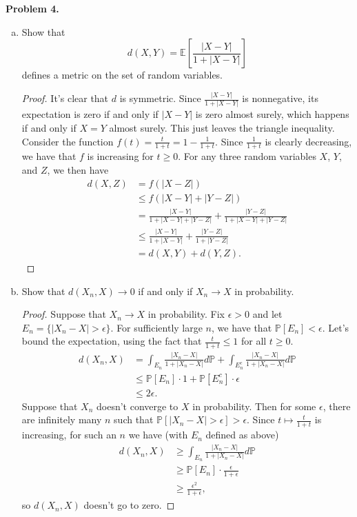 \documentclass[11pt,letterpaper]{report}
\newcommand{\E}{\mathbb{E}}
\newcommand{\Prob}{\mathbb{P}}
\begin{document}
\noindent\textbf{Problem 4. }
\begin{enumerate}[(a)]
	\item Show that
	\[
	d(X, Y) = \E\left[\frac{|X-Y|}{1+|X-Y|}\right]
	\]
	defines a metric on the set of random variables.
	\begin{proof}
		It's clear that $d$ is symmetric. Since $\frac{|X-Y|}{1+|X-Y|}$ is nonnegative, its expectation is zero if and only if $|X-Y|$ is zero almost surely, which happens if and only if $X = Y$ almost surely. This just leaves the triangle inequality.\\

		\noindent Consider the function $f(t) = \frac{t}{1+t}= 1 - \frac{1}{1+t}$.  Since $\frac{1}{1+t}$ is clearly decreasing, we have that $f$ is increasing for $t\geq 0$. For any three random variables $X$, $Y$, and $Z$, we then have
		\begin{align*}
			d(X, Z) &= f(|X-Z|)\\
			&\leq f(|X-Y| + |Y-Z|)\\
			&= \frac{|X-Y|}{1+|X-Y| + |Y-Z|} + \frac{|Y-Z|}{1+|X-Y| + |Y-Z|}\\
			&\leq \frac{|X-Y|}{1+|X-Y|} + \frac{|Y-Z|}{1+|Y-Z|}\\
			&= d(X, Y) + d(Y, Z).
		\end{align*}
	\end{proof}

	\item Show that $d(X_n, X)\to 0$ if and only if $X_n\to X$ in probability.
	\begin{proof}
		Suppose that $X_n\to X$ in probability. Fix $\epsilon > 0$ and let $E_n = \{|X_n - X|>\epsilon\}$. For sufficiently large $n$, we have that $\Prob[E_n] < \epsilon$. Let's bound the expectation, using the fact that $\frac{t}{1+t}\leq 1$ for all $t\geq 0$.
		\begin{align*}
			d(X_n, X) &= \int_{E_n}\frac{|X_n-X|}{1+|X_n-X|}d\Prob + \int_{E_n^c}\frac{|X_n-X|}{1+|X_n-X|}d\Prob\\
			&\leq \Prob[E_n]\cdot 1 + \Prob[E_n^c]\cdot \epsilon\\
			&\leq 2\epsilon.
		\end{align*}
		Suppose that $X_n$ doesn't converge to $X$ in probability. Then for some $\epsilon$, there are infinitely many $n$ such that $\Prob[|X_n -X|>\epsilon]>\epsilon$. Since $t\mapsto \frac{t}{1+t}$ is increasing, for such an $n$ we have (with $E_n$ defined as above)
		\begin{align*}
			d(X_n, X) &\geq \int_{E_n}\frac{|X_n- X|}{1+|X_n-X|}d\Prob\\
			&\geq \Prob[E_n]\cdot \frac{\epsilon}{1+\epsilon}\\
			&\geq \frac{\epsilon^2}{1+\epsilon},
		\end{align*}
		so $d(X_n, X)$ doesn't go to zero.
	\end{proof}
\end{enumerate}
\end{document}
